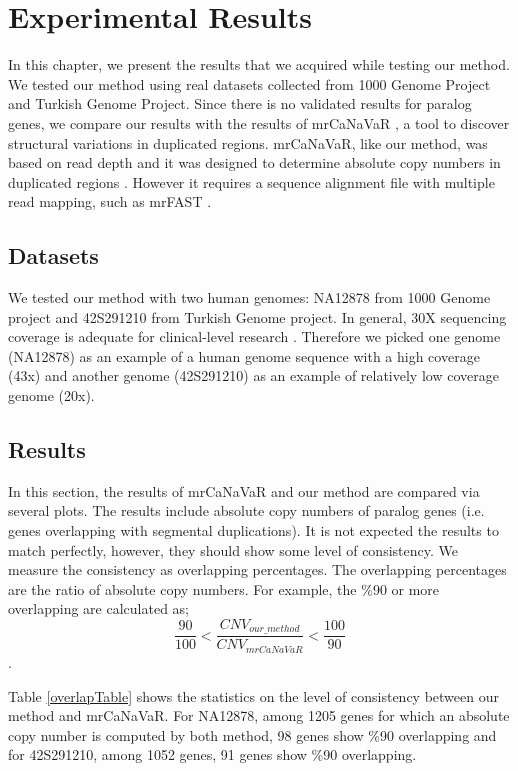 \chapter{Experimental Results}

In this chapter, we present the results that we acquired while testing our method. We tested our method using real datasets collected from 1000 Genome Project and Turkish Genome Project. Since there is no validated results for paralog genes, we compare our results with the results of mrCaNaVaR \cite{alkan2009personalized}, a tool to discover structural variations in duplicated regions. mrCaNaVaR, like our method, was based on read depth and it was designed to determine absolute copy numbers in duplicated regions \cite{kahveci2018whole}. However it requires a sequence alignment file with multiple read mapping, such as mrFAST \cite{alkan2009personalized}.


\section{Datasets}
We tested our method with two human genomes: NA12878 from 1000 Genome project and 42S291210 from Turkish Genome project. In general, 30X sequencing coverage is adequate for clinical-level research \cite{shevchenko2016clinical}. Therefore we picked one genome (NA12878) as an example of a human genome sequence with a high coverage (43x) and another genome (42S291210) as an example of relatively low coverage genome (20x).

\section{Results}
In this section, the results of mrCaNaVaR and our method are compared via several plots. The results include absolute copy numbers of paralog genes (i.e. genes overlapping with segmental duplications). It is not expected the results to match perfectly, however, they should show some level of consistency. We measure the consistency as overlapping percentages. The overlapping percentages are the ratio of absolute copy numbers. For example, the \%90 or more overlapping are calculated  as; $$\frac{90}{100} < \frac{CNV_{our\_method}}{CNV_{mrCaNaVaR}} < \frac{100}{90} $$.


Table \ref{overlapTable} shows the statistics on the level of consistency between our method and mrCaNaVaR. 
For NA12878, among 1205 genes for which an absolute copy number is computed by both method, 98 genes show \%90 overlapping and for 42S291210, among 1052 genes, 91 genes show \%90 overlapping.

